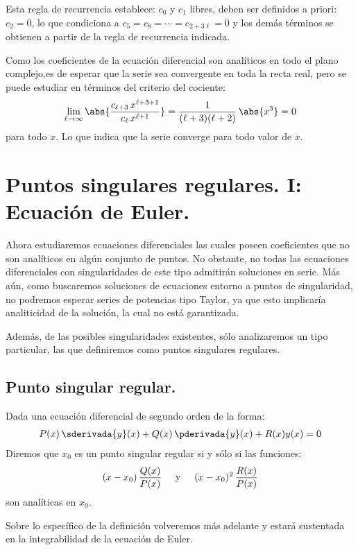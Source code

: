 \begin{ejemplo}
Esta regla de recurrencia establece: $c_{0}$ y $c_{1}$ libres, deben ser definidos a priori: $c_{2} = 0$, lo que condiciona a $c_{5} = c_{8} =  \cdots = c_{2+3 \ell} = 0$ y los demás términos se obtienen a partir de la regla de recurrencia indicada.
\par
Como los coeficientes de la ecuación diferencial son analíticos en todo el plano complejo,es de esperar que la serie sea convergente en toda la recta real, pero se puede estudiar en términos del criterio del cociente:
\begin{align*}
\lim_{\ell \to \infty} \abs{ \dfrac{c_{\ell+3} \, x^{\ell+3+1}}{c_{\ell} \, x^{\ell+1}}} = \dfrac{1}{(\ell + 3)(\ell + 2)} \, \abs{x^{3}} = 0
\end{align*}
para todo $x$. Lo que indica que la serie converge para todo valor de $x$.
\end{ejemplo}

\section{Puntos singulares regulares. I: Ecuación de Euler.}

Ahora estudiaremos ecuaciones diferenciales las cuales poseen coeficientes que no son analíticos en algún conjunto de puntos. No obstante, no todas las ecuaciones diferenciales con singularidades de este tipo admitirán soluciones en serie. Más aún, como buscaremos soluciones de ecuaciones entorno a puntos de singularidad, no podremos esperar series de potencias tipo Taylor, ya que esto implicaría analiticidad de la solución, la cual no está garantizada.
\par
Además, de las posibles singularidades existentes, sólo analizaremos un tipo particular, las que definiremos como puntos singulares regulares.

\subsection{Punto singular regular.}

Dada una ecuación diferencial de segundo orden de la forma:
\begin{align}
P (x) \, \sderivada{y} (x) + Q(x) \, \pderivada{y} (x) + R (x) y(x) = 0
\label{eq:ecuacion_08}
\end{align}
Diremos que $x_{0}$ es un punto singular regular si y sólo si las funciones:
\begin{align}
(x - x_{0}) \, \dfrac{Q (x)}{P (x)} \hspace{0.5cm} \mbox{y} \hspace{0.5cm} (x - x_{0})^{2} \, \dfrac{R (x)}{P (x)}
\end{align}
son analíticas en $x_{0}$.
\par
Sobre lo específico de la definición volveremos más adelante y estará sustentada en la integrabilidad de la ecuación de Euler.

